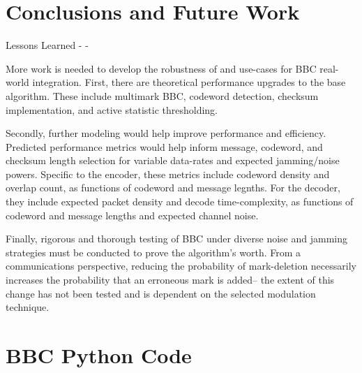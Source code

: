 \documentclass[conference]{IEEEtran}
\begin{document}
\newpage
\section{Conclusions and Future Work}

Lessons Learned   
-   \newline
-  \newline

     
More work is needed to develop the robustness of and use-cases for BBC real-world integration. First, there are theoretical performance upgrades to the base algorithm. These include multimark BBC, codeword detection, checksum implementation, and active statistic thresholding.   

Secondly, further modeling would help improve performance and efficiency. Predicted performance metrics would help inform message, codeword, and checksum length selection for variable data-rates and expected jamming/noise powers. Specific to the encoder, these metrics include codeword density and overlap count, as functions of codeword and message legnths. For the decoder, they include expected packet density and decode time-complexity, as functions of codeword and message lengths and expected channel noise.   

Finally, rigorous and thorough testing of BBC under diverse noise and jamming strategies must be conducted to prove the algorithm's worth. From a communications perspective, reducing the probability of mark-deletion necessarily increases the probability that an erroneous mark is added-- the extent of this change has not been tested and is dependent on the selected modulation technique.



\nocite{*}


\onecolumn
\newpage

\renewcommand\thesubsection{\arabic{subsection}}

\appendices
\section{BBC Python Code}

\end{document}
